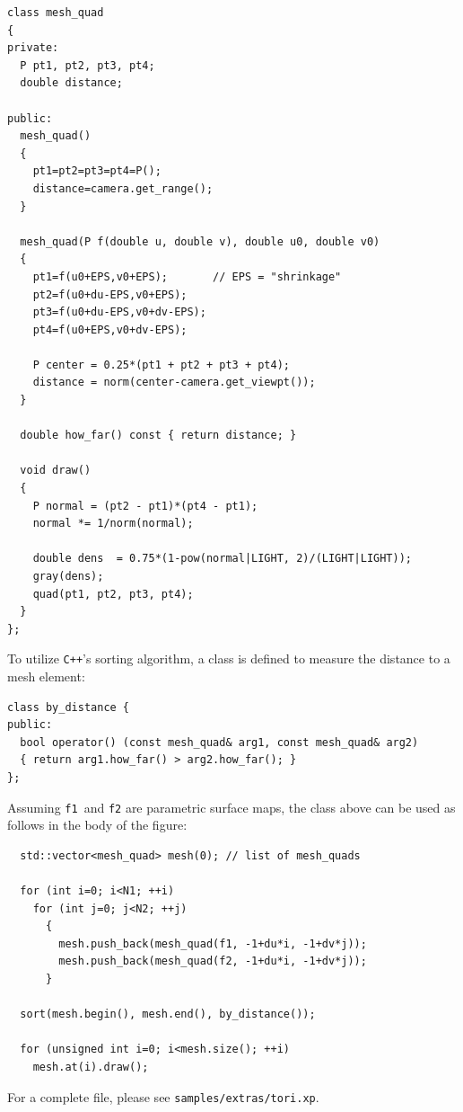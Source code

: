 \documentclass[12pt]{report}
\newcommand{\code}[1]{\texttt{#1}}
\newcommand{\filename}[1]{\texttt{#1}}
\newcommand{\CXX}{\code{C++}}
\begin{document}
\begin{footnotesize}
\begin{verbatim}
class mesh_quad
{
private:
  P pt1, pt2, pt3, pt4;
  double distance;

public:
  mesh_quad() 
  {
    pt1=pt2=pt3=pt4=P();
    distance=camera.get_range();
  }

  mesh_quad(P f(double u, double v), double u0, double v0)
  {
    pt1=f(u0+EPS,v0+EPS);       // EPS = "shrinkage"
    pt2=f(u0+du-EPS,v0+EPS);
    pt3=f(u0+du-EPS,v0+dv-EPS);
    pt4=f(u0+EPS,v0+dv-EPS);
    
    P center = 0.25*(pt1 + pt2 + pt3 + pt4);
    distance = norm(center-camera.get_viewpt());
  }

  double how_far() const { return distance; }

  void draw() 
  { 
    P normal = (pt2 - pt1)*(pt4 - pt1);
    normal *= 1/norm(normal);

    double dens  = 0.75*(1-pow(normal|LIGHT, 2)/(LIGHT|LIGHT));
    gray(dens); 
    quad(pt1, pt2, pt3, pt4); 
  }
};
\end{verbatim}
\end{footnotesize}
To utilize \CXX's sorting algorithm, a class is defined to measure the
distance to a mesh element:
\begin{footnotesize}
\begin{verbatim}
class by_distance {
public:
  bool operator() (const mesh_quad& arg1, const mesh_quad& arg2)
  { return arg1.how_far() > arg2.how_far(); }
};
\end{verbatim}
\end{footnotesize}
Assuming \code{f1}~and \code{f2} are parametric surface maps, the
class above can be used as follows in the body of the figure:
\begin{footnotesize}
\begin{verbatim}
  std::vector<mesh_quad> mesh(0); // list of mesh_quads

  for (int i=0; i<N1; ++i)
    for (int j=0; j<N2; ++j)
      {
        mesh.push_back(mesh_quad(f1, -1+du*i, -1+dv*j));
        mesh.push_back(mesh_quad(f2, -1+du*i, -1+dv*j));
      }

  sort(mesh.begin(), mesh.end(), by_distance());

  for (unsigned int i=0; i<mesh.size(); ++i)
    mesh.at(i).draw();
\end{verbatim}
\end{footnotesize}
For a complete file, please see \filename{samples/extras/tori.xp}.
\end{document}
